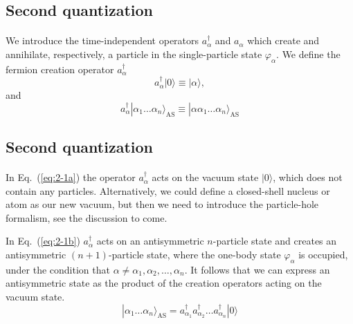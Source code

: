 \documentclass[%
twoside,                 %
final,                   %
10pt]{article}
\begin{document}
\noindent





\subsection{Second quantization}

\paragraph{}
We introduce the time-independent  operators
$a_\alpha^{\dagger}$ and $a_\alpha$   which create and annihilate, respectively, a particle 
in the single-particle state 
$\varphi_\alpha$. 
We define the fermion creation operator
$a_\alpha^{\dagger}$ 
\begin{equation}
	a_\alpha^{\dagger}|0\rangle \equiv  |\alpha\rangle  \label{eq:2-1a},
\end{equation}
and
\begin{equation}
	a_\alpha^{\dagger}|\alpha_1\dots \alpha_n\rangle_{\mathrm{AS}} \equiv  |\alpha\alpha_1\dots \alpha_n\rangle_{\mathrm{AS}} \label{eq:2-1b}
\end{equation}



\subsection{Second quantization}

\paragraph{}
In Eq.~(\ref{eq:2-1a}) 
the operator  $a_\alpha^{\dagger}$  acts on the vacuum state 
$|0\rangle$, which does not contain any particles. Alternatively, we could define  a closed-shell nucleus or atom as our new vacuum, but then
we need to introduce the particle-hole  formalism, see the discussion to come. 

In Eq.~(\ref{eq:2-1b}) $a_\alpha^{\dagger}$ acts on an antisymmetric $n$-particle state and 
creates an antisymmetric $(n+1)$-particle state, where the one-body state 
$\varphi_\alpha$ is occupied, under the condition that
$\alpha \ne \alpha_1, \alpha_2, \dots, \alpha_n$. 
It follows that we can express an antisymmetric state as the product of the creation
operators acting on the vacuum state.  
\begin{equation}
	|\alpha_1\dots \alpha_n\rangle_{\mathrm{AS}} = a_{\alpha_1}^{\dagger} a_{\alpha_2}^{\dagger} \dots a_{\alpha_n}^{\dagger} |0\rangle \label{eq:2-2}
\end{equation}
\end{document}
